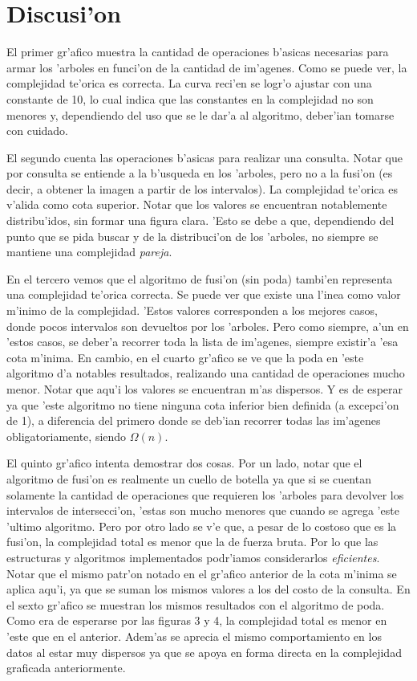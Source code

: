 \section{Discusi'on}
El primer gr'afico muestra la cantidad de operaciones b'asicas necesarias para armar los 'arboles en funci'on de la cantidad de im'agenes. Como se puede ver, la complejidad te'orica es correcta. La curva reci'en se logr'o ajustar con una constante de 10, lo cual indica que las constantes en la complejidad no son menores y, dependiendo del uso que se le dar'a al algoritmo, deber'ian tomarse con cuidado.

El segundo cuenta las operaciones b'asicas para realizar una consulta. Notar que por consulta se entiende a la b'usqueda en los 'arboles, pero no a la fusi'on (es decir, a obtener la imagen a partir de los intervalos). La complejidad te'orica es v'alida como cota superior. Notar que los valores se encuentran notablemente distribu'idos, sin formar una figura clara. 'Esto se debe a que, dependiendo del punto que se pida buscar y de la distribuci'on de los 'arboles, no siempre se mantiene una complejidad \emph{pareja}.

En el tercero vemos que el algoritmo de fusi'on (sin poda) tambi'en representa una complejidad te'orica correcta. Se puede ver que existe una l'inea como valor m'inimo de la complejidad. 'Estos valores corresponden a los mejores casos, donde pocos intervalos son devueltos por los 'arboles. Pero como siempre, a'un en 'estos casos, se deber'a recorrer toda la lista de im'agenes, siempre existir'a 'esa cota m'inima. En cambio, en el cuarto gr'afico se ve que la poda en 'este algoritmo d'a notables resultados, realizando una cantidad de operaciones mucho menor. Notar que aqu'i los valores se encuentran m'as dispersos. Y es de esperar ya que 'este algoritmo no  tiene ninguna cota inferior bien definida (a excepci'on de 1), a diferencia del primero donde se deb'ian recorrer todas las im'agenes obligatoriamente, siendo $\Omega(n)$.

El quinto gr'afico intenta demostrar dos cosas. Por un lado, notar que el algoritmo de fusi'on es realmente un cuello de botella ya que si se cuentan solamente la cantidad de operaciones que requieren los 'arboles para devolver los intervalos de intersecci'on, 'estas son mucho menores que cuando se agrega 'este 'ultimo algoritmo. Pero por otro lado se v'e que, a pesar de lo costoso que es la fusi'on, la complejidad total es menor que la de fuerza bruta. Por lo que las estructuras y algoritmos implementados podr'iamos considerarlos \emph{eficientes}. Notar que el mismo patr'on notado en el gr'afico anterior de la cota m'inima se aplica aqu'i, ya que se suman los mismos valores a los del costo de la consulta. En el sexto gr'afico se muestran los mismos resultados con el algoritmo de poda. Como era de esperarse por las figuras 3 y 4, la complejidad total es menor en 'este que en el anterior. Adem'as se aprecia el mismo comportamiento en los datos al estar muy dispersos ya que se apoya en forma directa en la complejidad graficada anteriormente.
